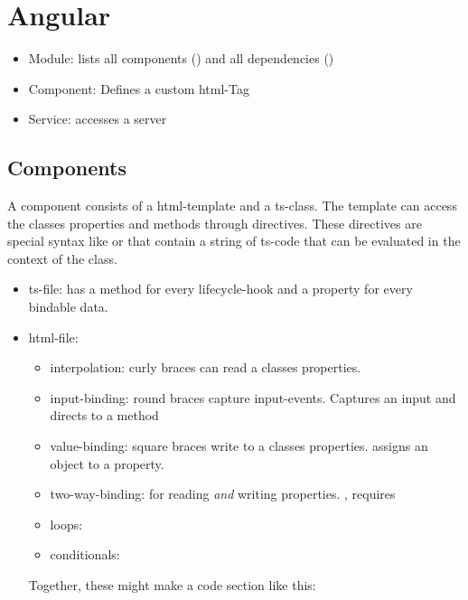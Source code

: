 \section{Angular}

\begin{itemize}
    \item Module: lists all components () and all dependencies ()
    \item Component: Defines a custom html-Tag
    \item Service: accesses a server
\end{itemize}

\subsection{Components}

A component consists of a html-template and a ts-class. The template can access the classes properties and methods through directives.
These directives are special syntax like \inlinecode{\{\}} or  that contain a string of ts-code that can be evaluated in the context of the class.

\begin{itemize}
    \item ts-file: has a method for every lifecycle-hook and a property for every bindable data.
    \item html-file:
            \begin{itemize}
                \item interpolation: curly braces can read a classes properties. 
                \item input-binding: round braces capture input-events.  Captures an input and directs to a method
                \item value-binding: square braces write to a classes properties.  assigns an object to a property. 
                \item two-way-binding: for reading \emph{and} writing properties. , requires 
                \item loops: 
                \item conditionals: 
            \end{itemize}
            Together, these might make a code section like this: 
\end{itemize}

